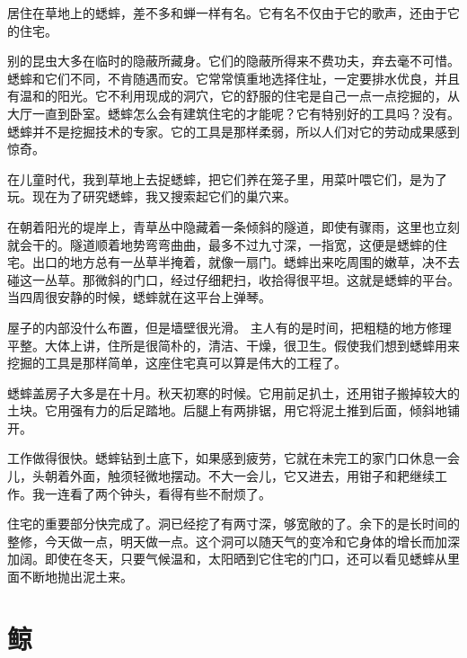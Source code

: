 \documentclass[12pt,UTF-8,openany]{ctexbook}
\begin{document}
\begin{large}
    
    居住在草地上的蟋蟀，差不多和蝉一样有名。它有名不仅由于它的歌声，还由于它的住宅。
    
    别的昆虫大多在临时的隐蔽所藏身。它们的隐蔽所得来不费功夫，弃去毫不可惜。蟋蟀和它们不同，不肯随遇而安。它常常慎重地选择住址，一定要排水优良，并且有温和的阳光。它不利用现成的洞穴，它的舒服的住宅是自己一点一点挖掘的，从大厅一直到卧室。蟋蟀怎么会有建筑住宅的才能呢？它有特别好的工具吗？没有。蟋蟀并不是挖掘技术的专家。它的工具是那样柔弱，所以人们对它的劳动成果感到惊奇。
    
    在儿童时代，我到草地上去捉蟋蟀，把它们养在笼子里，用菜叶喂它们，是为了玩。现在为了研究蟋蟀，我又搜索起它们的巢穴来。
    
    在朝着阳光的堤岸上，青草丛中隐藏着一条倾斜的隧道，即使有骤雨，这里也立刻就会干的。隧道顺着地势弯弯曲曲，最多不过九寸深，一指宽，这便是蟋蟀的住宅。出口的地方总有一丛草半掩着，就像一扇门。蟋蟀出来吃周围的嫩草，决不去碰这一丛草。那微斜的门口，经过仔细耙扫，收拾得很平坦。这就是蟋蟀的平台。当四周很安静的时候，蟋蟀就在这平台上弹琴。
    
    屋子的内部没什么布置，但是墙壁很光滑。 主人有的是时间，把粗糙的地方修理平整。大体上讲，住所是很简朴的，清洁、干燥，很卫生。假使我们想到蟋蟀用来挖掘的工具是那样简单，这座住宅真可以算是伟大的工程了。
    
    蟋蟀盖房子大多是在十月。秋天初寒的时候。它用前足扒土，还用钳子搬掉较大的土块。它用强有力的后足踏地。后腿上有两排锯，用它将泥土推到后面，倾斜地铺开。
    
    工作做得很快。蟋蟀钻到土底下，如果感到疲劳，它就在未完工的家门口休息一会儿，头朝着外面，触须轻微地摆动。不大一会儿，它又进去，用钳子和耙继续工作。我一连看了两个钟头，看得有些不耐烦了。
    
    住宅的重要部分快完成了。洞已经挖了有两寸深，够宽敞的了。余下的是长时间的整修，今天做一点，明天做一点。这个洞可以随天气的变冷和它身体的增长而加深加阔。即使在冬天，只要气候温和，太阳晒到它住宅的门口，还可以看见蟋蟀从里面不断地抛出泥土来。
    
\end{large}



\chapter{鲸}
\end{document}

